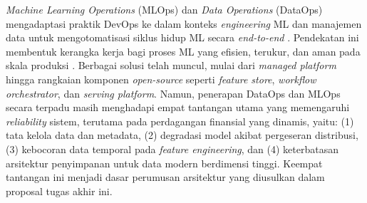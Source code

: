 \textit{Machine Learning Operations} (MLOps) dan \textit{Data Operations} (DataOps) mengadaptasi praktik DevOps ke dalam konteks \textit{engineering} ML dan manajemen data untuk mengotomatisasi siklus hidup ML secara \textit{end-to-end} \autocite{kreuzberger2023mlops}. Pendekatan ini membentuk kerangka kerja bagi proses ML yang efisien, terukur, dan aman pada skala produksi \autocite{jain2025integrating, rella2022mlops, ahmad2024mlops}. Berbagai solusi telah muncul, mulai dari \textit{managed platform} hingga rangkaian komponen \textit{open-source} seperti \textit{feature store}, \textit{workflow orchestrator}, dan \textit{serving platform}. Namun, penerapan DataOps dan MLOps secara terpadu masih menghadapi empat tantangan utama yang memengaruhi \textit{reliability} sistem, terutama pada perdagangan finansial yang dinamis, yaitu: (1) tata kelola data dan metadata, (2) degradasi model akibat pergeseran distribusi, (3) kebocoran data temporal pada \textit{feature engineering}, dan (4) keterbatasan arsitektur penyimpanan untuk data modern berdimensi tinggi. Keempat tantangan ini menjadi dasar perumusan arsitektur yang diusulkan dalam proposal tugas akhir ini.


